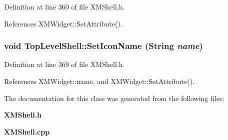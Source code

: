 Definition at line 360 of file XMShell.h.

References XMWidget::Set\-Attribute().
\subsubsection{\setlength{\rightskip}{0pt plus 5cm}void Top\-Level\-Shell::Set\-Icon\-Name (String {\em name})\hspace{0.3cm}{\tt  [inline]}}\label{classTopLevelShell_a4}




Definition at line 369 of file XMShell.h.

References XMWidget::name, and XMWidget::Set\-Attribute().

The documentation for this class was generated from the following files:\begin{CompactItemize}
\item 
{\bf XMShell.h}\item 
{\bf XMShell.cpp}\end{CompactItemize}
